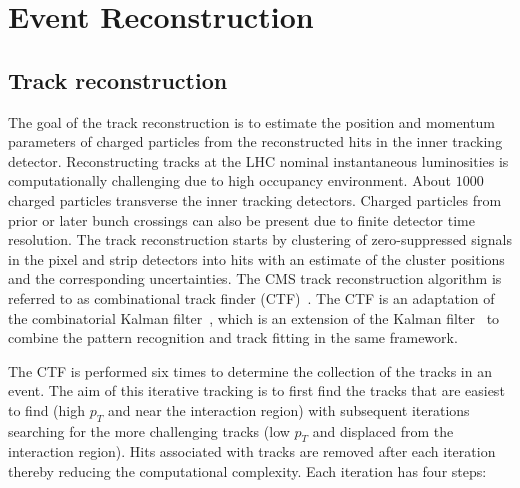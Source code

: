 \chapter{Event Reconstruction}

\section{Track reconstruction}

The goal of the track reconstruction is to estimate the position and momentum parameters of charged particles from the reconstructed hits in the inner tracking detector. Reconstructing tracks at the LHC nominal instantaneous luminosities is computationally challenging due to high occupancy environment. About $1000$ charged particles transverse the inner tracking detectors. Charged particles from prior or later bunch crossings can also be present due to finite detector time resolution.  The track reconstruction starts by clustering of zero-suppressed signals in the pixel and strip detectors into hits with an estimate of the cluster positions and the corresponding uncertainties. The CMS track reconstruction algorithm is referred to as combinational track finder (CTF)~\cite{Adam:934067,Chatrchyan:2014fea}. The CTF is an adaptation of the combinatorial Kalman filter~\cite{BILLOIR1989390,BILLOIR1990219,MANKEL1997169}, which is an extension of the Kalman filter~\cite{FRUHWIRTH1987444} to combine the pattern recognition and track fitting in the same framework. 

The CTF is performed six times to determine the collection of the tracks in an event. The aim of this iterative tracking is to first find the tracks that are easiest to find (high $p_{T}$ and near the interaction region) with subsequent iterations searching for the more challenging tracks (low $p_{T}$ and displaced from the interaction region). Hits associated with tracks are removed after each iteration thereby reducing the computational complexity. Each iteration has four steps:

